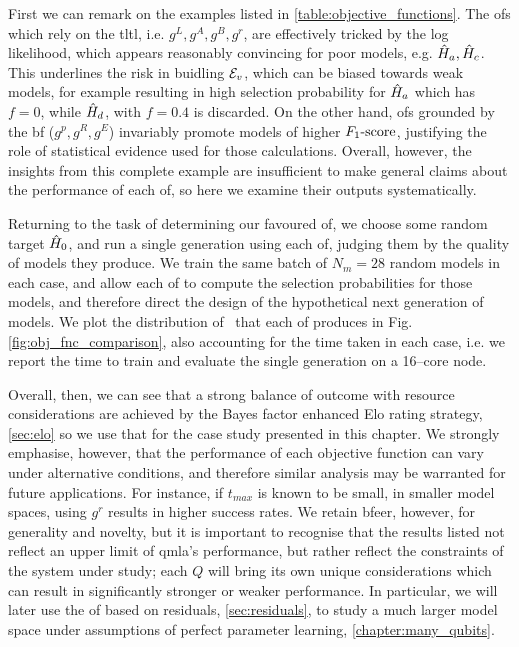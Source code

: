 First we can remark on the examples listed in \cref{table:objective_functions}. 
The \glspl{of} which rely on the \gls{tltl}, i.e. $g^L, g^A, g^B, g^r$, 
    are effectively tricked by the log likelihood, which appears reasonably convincing for 
    poor models, e.g. $\hat{H}_a, \hat{H}_c$. 
This underlines the risk in buidling ${ \mathcal{E} }_v$, which can be biased towards weak models, 
    for example resulting in high selection probability for $\hat{H}_a$ which has $f=0$, 
    while $\hat{H}_d$, with $f=0.4$ is discarded. 
On the other hand, \glspl{of} grounded by the \gls{bf} ($g^p, g^R, g^E$) invariably 
    promote models of higher $ F_{1}\text{-score} $, justifying the role of statistical evidence 
    used for those calculations. 
Overall, however, the insights from this complete example are insufficient to 
    make general claims about the performance of each \gls{of}, 
    so here we examine their outputs systematically. 
\par 

Returning to the task of determining our favoured \gls{of}, 
    we choose some random target $\hat{H}_0$, 
    and run a single generation using each \gls{of}, 
    judging them by the quality of models they produce.
We train the same batch of $N_m=28$ random models in each case, and allow each \gls{of} 
    to compute the selection probabilities for those models, 
    and therefore direct the design of the hypothetical next generation of models. 
We plot the distribution of \fs \ that each \gls{of} produces in Fig. \ref{fig:obj_fnc_comparison},
    also accounting for the time taken in each case, i.e. 
    we report the time to train and evaluate the single generation on a 16--core node.
\par

Overall, then, we can see that a strong balance of outcome with resource considerations 
    are achieved by the Bayes factor enhanced Elo rating strategy, \cref{sec:elo}
    so we use that for the case study presented in this chapter. 
We strongly emphasise, however, that the performance of each objective function
    can vary under alternative conditions, and therefore similar analysis may 
    be warranted for future applications. 
For instance, if $t_{max}$ is known to be small, 
    in smaller model spaces, using $g^r$ results in higher success rates.
We retain \gls{bfeer}, however, for generality and novelty, 
    but it is important to recognise that the results listed not reflect
    an upper limit of \gls{qmla}'s performance, 
    but rather reflect the constraints of the system under study; 
    each $Q$ will bring its own unique considerations which can result in 
    significantly stronger or weaker performance. 
In particular, we will later use the \gls{of} based on residuals, \cref{sec:residuals}, 
    to study a much larger model space under assumptions of perfect parameter learning, \cref{chapter:many_qubits}.

